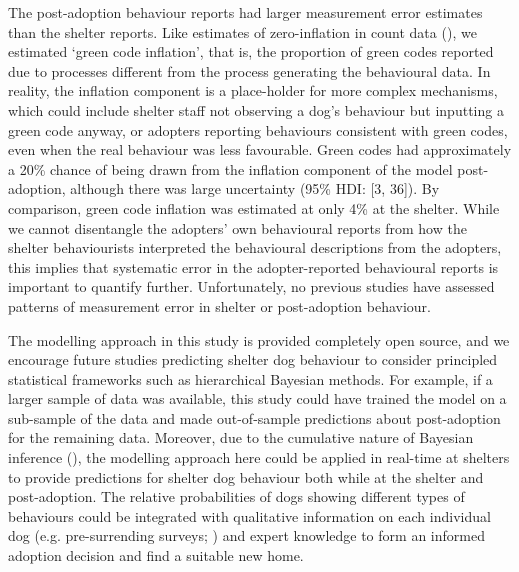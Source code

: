 \documentclass[12pt]{article}
\begin{document}
The post-adoption behaviour reports had larger measurement error estimates than the shelter reports. Like estimates of zero-inflation in count data (\cite{lambert1992}), we estimated `green code inflation', that is, the proportion of green codes reported due to processes different from the process generating the behavioural data. In reality, the inflation component is a place-holder for more complex mechanisms, which could include shelter staff not observing a dog's behaviour but inputting a green code anyway, or adopters reporting behaviours consistent with green codes, even when the real behaviour was less favourable. Green codes had approximately a 20\% chance of being drawn from the inflation component of the model post-adoption, although there was large uncertainty (95\% HDI: [3, 36]). By comparison, green code inflation was estimated at only 4\% at the shelter. While we cannot disentangle the adopters' own behavioural reports from how the shelter behaviourists interpreted the behavioural descriptions from the adopters, this implies that systematic error in the adopter-reported behavioural reports is important to quantify further. Unfortunately, no previous studies have assessed patterns of measurement error in shelter or post-adoption behaviour.

The modelling approach in this study is provided completely open source, and we encourage future studies predicting shelter dog behaviour to consider principled statistical frameworks such as hierarchical Bayesian methods. For example, if a larger sample of data was available, this study could have trained the model on a sub-sample of the data and made out-of-sample predictions about post-adoption for the remaining data. Moreover, due to the cumulative nature of Bayesian inference (\cite{mcelreath2020}), the modelling approach here could be applied in real-time at shelters to provide predictions for shelter dog behaviour both while at the shelter and post-adoption. The relative probabilities of dogs showing different types of behaviours could be integrated with qualitative information on each individual dog (e.g. pre-surrending surveys; \cite{ASPCA2018}) and expert knowledge to form an informed adoption decision and find a suitable new home.
\end{document}
